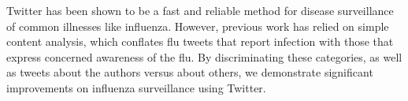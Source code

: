 Twitter has been shown to be a fast and reliable method for disease surveillance of common illnesses
 like influenza. However, previous work has relied on simple content analysis,
 which conflates flu tweets that report
 infection with those that express concerned awareness of the flu. By
 discriminating these categories, as well
 as tweets about the authors versus about others, we demonstrate significant
 improvements on influenza surveillance using Twitter.

